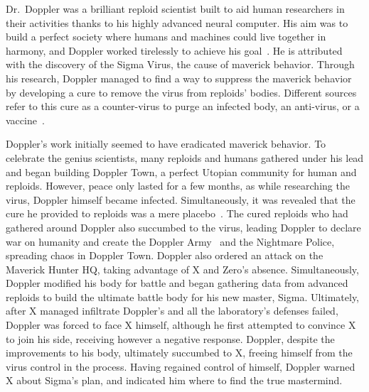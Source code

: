 Dr.~Doppler was a brilliant reploid scientist built to aid human researchers in their activities thanks to his highly advanced neural computer. His aim was to build a perfect society where humans and machines could live together in harmony, and Doppler worked tirelessly to achieve his goal~\cite{wayback:X3_resources}. He is attributed with the discovery of the Sigma Virus, the cause of maverick behavior. Through his research, Doppler managed to find a way to suppress the maverick behavior by developing a cure to remove the virus from reploids' bodies. Different sources refer to this cure as a counter-virus to purge an infected body, an anti-virus, or a vaccine~\cite{Xcoll1:Manual_X3,X3:Manual,book:MH_field_guide}.

Doppler's work initially seemed to have eradicated maverick behavior. To celebrate the genius scientists, many reploids and humans gathered under his lead and began building Doppler Town, a perfect Utopian community for human and reploids. However, peace only lasted for a few months, as while researching the virus, Doppler himself became infected. Simultaneously, it was revealed that the cure he provided to reploids was a mere placebo~\cite{book:MH_field_guide}. The cured reploids who had gathered around Doppler also succumbed to the virus, leading Doppler to declare war on humanity and create the Doppler Army~\cite{wiki:Doppler} and the Nightmare Police, spreading chaos in Doppler Town. Doppler also ordered an attack on the Maverick Hunter HQ, taking advantage of X and Zero's absence. Simultaneously, Doppler modified his body for battle and began gathering data from advanced reploids to build the ultimate battle body for his new master, Sigma. Ultimately, after X managed infiltrate Doppler's and all the laboratory's defenses failed, Doppler was forced to face X himself, although he first attempted to convince X to join his side, receiving however a negative response. Doppler, despite the improvements to his body, ultimately succumbed to X, freeing himself from the virus control in the process. Having regained control of himself, Doppler warned X about Sigma's plan, and indicated him where to find the true mastermind.

